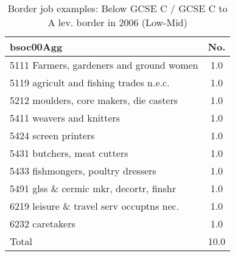 \begin{table}[h!]
	\centering
	\caption{Border job examples: Below GCSE C / GCSE C to A lev. border in 2006 (Low-Mid)}
	\label{tab:357212mult}
	\begin{tabular}{lc}
	\toprule
bsoc00Agg&No. \\
\hline
5111 Farmers, gardeners and ground women&1.0 \\
5119 agricult and fishing trades n.e.c.&1.0 \\
5212 moulders, core makers, die casters&1.0 \\
5411 weavers and knitters&1.0 \\
5424 screen printers&1.0 \\
5431 butchers, meat cutters&1.0 \\
5433 fishmongers, poultry dressers&1.0 \\
5491 glss \& cermic mkr, decortr, finshr&1.0 \\
6219 leisure \& travel serv occuptns nec.&1.0 \\
6232 caretakers&1.0 \\
Total&10.0 \\
\bottomrule
\bottomrule
\end{tabular}
\end{table}
